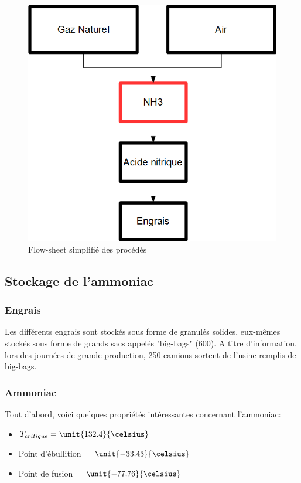\begin{figure} [h]
\begin{center}
\includegraphics[scale=0.4]{FlYara.png}
\end{center}
\caption{Flow-sheet simplifié des procédés}
\end{figure}
\subsection{Stockage de l'ammoniac}
\subsubsection{Engrais}
Les différents engrais sont stockés sous forme de granulés solides, eux-mêmes stockés sous forme de grands sacs appelés "big-bags" (\unit{600}{\kilogram}). A titre d'information, lors des journées de grande production, 250 camions sortent de l'usine remplis de big-bags. 
\subsubsection{Ammoniac}
Tout d'abord, voici quelques propriétés intéressantes concernant l'ammoniac:

\begin{itemize}
\item{$T_{critique} = \unit{132.4}{\celsius}$}

\item{Point d'ébullition = $\unit{-33.43}{\celsius}$}

\item{Point de fusion = $\unit{-77.76}{\celsius}$}
\end{itemize}

